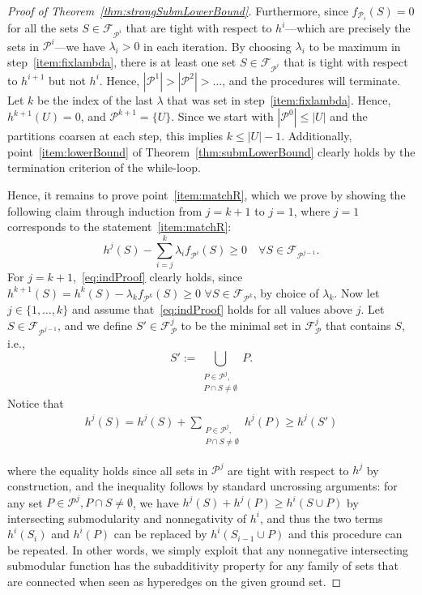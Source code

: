 \documentclass[11pt, letterpaper]{article}
\theoremstyle{definition}
\begin{document}
\begin{proof}[Proof of Theorem~\ref{thm:strongSubmLowerBound}]
Furthermore, since $f_{\mathcal{P}_i}(S)=0$
for all the sets $S\in \mathcal{F}_{\mathcal{P}^i}$ that
are tight with respect to $h^i$---which are precisely the sets
in $\mathcal{P}^i$---we have $\lambda_i>0$ in each iteration.
By choosing $\lambda_i$ to be maximum in step~\eqref{item:fixlambda},
there is at least one set $S\in \mathcal{F}_{\mathcal{P}^i}$
that is tight with respect to $h^{i+1}$ but not $h^i$. Hence,
$|\mathcal{P}^1|>|\mathcal{P}^2|> \dots$, and the procedures
will terminate.
Let $k$ be the index of the last $\lambda$ that was
set in step~\eqref{item:fixlambda}. Hence, $h^{k+1}(U)=0$,
and $\mathcal{P}^{k+1}=\{U\}$.
Since we start with $|\mathcal{P}^0|\leq |U|$ and the partitions
coarsen at each step, this implies $k\leq |U|-1$.
Additionally, point~\eqref{item:lowerBound} of
Theorem~\ref{thm:submLowerBound} clearly holds by the
termination criterion of the while-loop.

Hence, it remains to prove point~\eqref{item:matchR},
which we prove by showing the following claim through
induction from $j=k+1$ to $j=1$, where $j=1$ corresponds
to the statement~\eqref{item:matchR}:
\begin{equation}\label{eq:indProof}
h^j(S) - \sum_{i=j}^k \lambda_i f_{\mathcal{P}^i}(S) \geq 0
\quad \forall S\in \mathcal{F}_{\mathcal{P}^{j-1}}.
\end{equation}
For $j=k+1$,~\eqref{eq:indProof} clearly holds, since
$h^{k+1}(S)=h^{k}(S)-\lambda_{k} f_{\mathcal{P}^{k}}(S) \geq 0$
$\forall S\in \mathcal{F}_{\mathcal{P}^{k}}$, by
choice of $\lambda_k$. Now let $j\in \{1,\dots, k\}$ and assume
that~\eqref{eq:indProof} holds for all values above $j$.
Let $S\in \mathcal{F}_{\mathcal{P}^{j-1}}$, and we define
$S'\in \mathcal{F}_{\mathcal{P}}^j$ to be the minimal set
in $\mathcal{F}_{\mathcal{P}}^j$ that contains $S$, i.e.,
\begin{equation*}
S' := \bigcup_{\substack{P\in \mathcal{P}^j,\\
P\cap S \neq \emptyset}} P.
\end{equation*}
Notice that
\begin{align}\label{eq:coarsening}
h^{j}(S) =
h^{j}(S) +
\sum_{\substack{P\in \mathcal{P}^j,\\ P\cap S\neq \emptyset}}
h^{j}(P)\geq h^{j}(S')
\end{align}



where the equality holds since all sets in $\mathcal{P}^j$
are tight with respect to $h^j$ by construction, and the
inequality follows by standard uncrossing arguments:
for any set $P\in \mathcal{P}^j, P\cap S\neq \emptyset$,
we have $h^{j}(S)+h^{j}(P)\geq h^i(S\cup P)$
by intersecting submodularity and nonnegativity of $h^i$,
and thus the two terms $h^i(S_{i})$ and
$h^i(P)$ can be replaced by $h^i(S_{i-1}\cup P)$ and
this procedure can be repeated.
In other words, we simply exploit that any nonnegative intersecting
submodular function has the subadditivity property for any
family of sets that are connected when seen as hyperedges
on the given ground set.


\end{proof}
\end{document}
